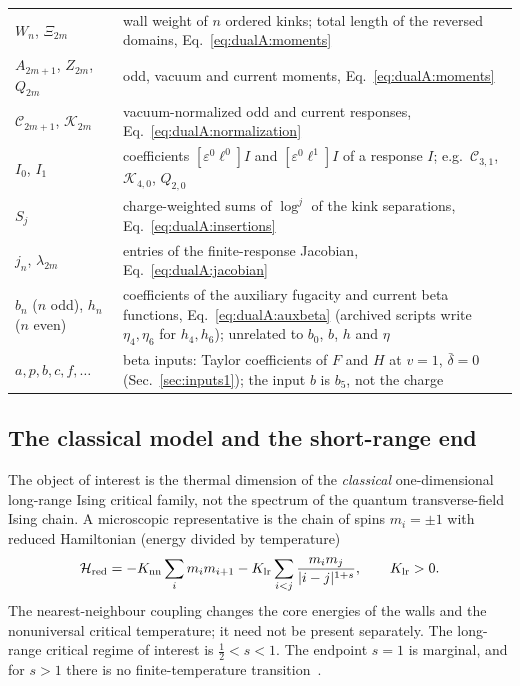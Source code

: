 \documentclass[11pt,a4paper]{article}
\numberwithin{equation}{section}
\newcommand{\db}{\bar\delta}
\begin{document}
{\begin{longtable}{@{}>{\raggedright\arraybackslash}p{}>{\raggedright\arraybackslash}p{}@{}}
$W_n$, $\Xi_{2m}$ & wall weight of $n$ ordered kinks; total length of the reversed domains,
 Eq.~\eqref{eq:dualA:moments}\\
$A_{2m+1}$, $Z_{2m}$, $Q_{2m}$ & odd, vacuum and current moments, Eq.~\eqref{eq:dualA:moments}\\
$\mathcal C_{2m+1}$, $\mathcal K_{2m}$ & vacuum-normalized odd and current responses,
 Eq.~\eqref{eq:dualA:normalization}\\
$I_0$, $I_1$ & coefficients $[\varepsilon^0\ell^0]I$ and $[\varepsilon^0\ell^1]I$ of a response $I$; e.g.\
 $\mathcal C_{3,1}$, $\mathcal K_{4,0}$, $Q_{2,0}$\\
$S_j$ & charge-weighted sums of $\log^j$ of the kink separations, Eq.~\eqref{eq:dualA:insertions}\\
$j_n$, $\lambda_{2m}$ & entries of the finite-response Jacobian, Eq.~\eqref{eq:dualA:jacobian}\\
$b_n$ ($n$ odd), $h_n$ ($n$ even) & coefficients of the auxiliary fugacity and current beta functions,
 Eq.~\eqref{eq:dualA:auxbeta} (archived scripts write $\eta_4,\eta_6$ for $h_4,h_6$); unrelated to $b_0$, $b$, $h$ and $\eta$\\
$a,p,b,c,f,\dots$ & beta inputs: Taylor coefficients of $F$ and $H$ at $v=1$, $\db=0$ (Sec.~\ref{sec:inputs1}); the
 input $b$ is $b_5$, not the charge\\
\end{longtable}
}

\subsection{The classical model and the short-range end}\label{app:dualA:model}
The object of interest is the thermal dimension of the \emph{classical} one-dimensional long-range Ising critical
family, not the spectrum of the quantum transverse-field Ising chain. A microscopic representative is the chain of
spins $m_i=\pm1$ with reduced Hamiltonian (energy divided by temperature)
\begin{equation}
 \mathcal H_{\rm red}=-K_{\rm nn}\sum_i m_im_{i+1}-K_{\rm lr}\sum_{i<j}\frac{m_im_j}{|i-j|^{1+s}},
 \qquad K_{\rm lr}>0.
 \label{eq:dualA:lattice}
\end{equation}
The nearest-neighbour coupling changes the core energies of the walls and the nonuniversal critical temperature; it
need not be present separately. The long-range critical regime of interest is $\frac12<s<1$. The endpoint $s=1$ is
marginal, and for $s>1$ there is no finite-temperature transition~\cite{Benedetti:2024wgx,Benedetti:2025nzp}.
\end{document}
